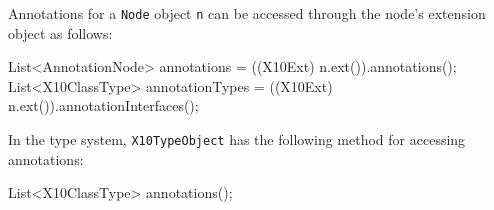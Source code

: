 Annotations for a \texttt{Node} object \texttt{n} can be accessed through the
node's extension object as follows:

\begin{x10}
  List<AnnotationNode> annotations =
    ((X10Ext) n.ext()).annotations();
  List<X10ClassType> annotationTypes =
    ((X10Ext) n.ext()).annotationInterfaces();
\end{x10}
In the type system, \texttt{X10TypeObject} has the following
method for accessing annotations:
\begin{x10}
  List<X10ClassType> annotations();
\end{x10}








